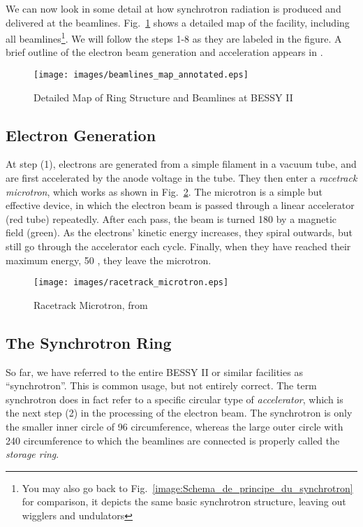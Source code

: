 \documentclass[a4paper,10pt]{article}
\begin{document}
    We can now look in some detail at how synchrotron radiation is produced and
delivered at the beamlines. Fig.~\ref{image:beamlines_map_annotated} shows a
detailed map of the facility, including all beamlines\footnote{You may also go
back to Fig.~\ref{image:Schema_de_principe_du_synchrotron} for comparison, it
depicts the same basic synchrotron structure, leaving out wigglers and
undulators}. We will follow the steps 1-8 as they are labeled in the figure.
A brief outline of the electron beam generation and acceleration
appears in \citep{kramer1993}.

\begin{figure}[htbp]
    \centering
    \texttt{[image: images/beamlines\_map\_annotated.eps]}
    \caption{Detailed Map of Ring Structure and Beamlines at BESSY II}
  \label{image:beamlines_map_annotated}
\end{figure}

    \subsection{Electron Generation}

    At step (1), electrons are generated from a simple filament in a vacuum
tube, and are first accelerated by the anode voltage in the tube. They then
enter a \emph{racetrack microtron}, which works as shown in
Fig.~\ref{image:racetrack_microtron}. The microtron is a simple but effective
device, in which the electron beam is passed through a linear accelerator (red
tube) repeatedly. After each pass, the beam is turned {180\degree} by a
magnetic field (green). As the electrons' kinetic energy increases, they spiral
outwards, but still go through the accelerator each cycle. Finally, when they
have reached their maximum energy, {50 \mega\electronvolt}, they leave the
microtron.

\begin{figure}[htbp]
    \centering
\texttt{[image: images/racetrack\_microtron.eps]}
    \caption{Racetrack Microtron, from \citep{mainz_prospekt}}
  \label{image:racetrack_microtron}
\end{figure}



    \subsection{The Synchrotron Ring}
    So far, we have referred to the entire BESSY II or similar facilities as
``synchrotron''. This is common usage, but not entirely correct. The term
synchrotron does in fact refer to a specific circular type of
\emph{accelerator}, which is the next step (2) in the processing of the
electron beam. The synchrotron is only the smaller inner circle of {96
\meter} circumference, whereas the large outer circle with {240 \meter}
circumference to which the beamlines are connected is properly called
the \emph{storage ring}.
\end{document}
